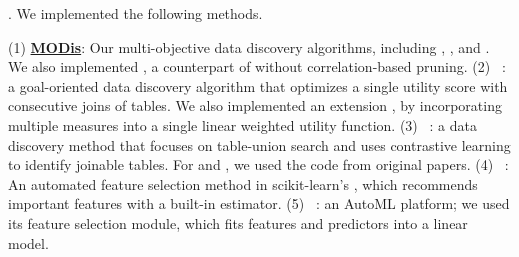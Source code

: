 . 
We implemented the following methods. 

\sstab
(1) \textbf{\underline{MODis}}: Our multi-objective data discovery algorithms, including \apxmodis, \bimodis, and \divmodis. We also implemented \nomodis, a counterpart of \bimodis without correlation-based pruning. 
(2) \underline{\metam}~\cite{galhotra2023metam}: 
a goal-oriented data discovery algorithm
that optimizes a single utility score with consecutive joins of tables. 
We also implemented an extension \metammo, 
by incorporating multiple measures into a single 
linear weighted utility function. 
(3) \underline{\starmie}~\cite{fan2023semantics}: a data discovery method that focuses on table-union search and uses contrastive learning to identify joinable tables.
For \metam and \starmie, we used the code from 
original papers. 
(4) \underline{\sklearn}~\cite{scikit-learn}: 
An automated feature selection method 
in scikit-learn's , which recommends important features with a built-in 
estimator.
(5) \underline{\ho}~\cite{h2o_platform}: an AutoML platform; we used its feature selection module, which fits features and predictors into a linear model.

